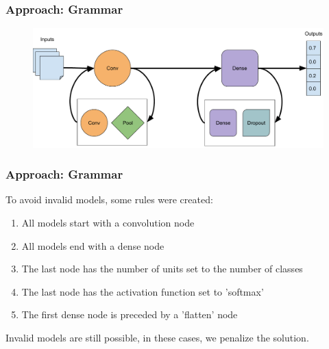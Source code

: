 \documentclass[aspectratio=169]{beamer}
\begin{document}
		\begin{frame}
			\frametitle{Approach: Grammar}
			
			\begin{figure}
				\includegraphics[width=\linewidth]{images/mapping-example.pdf}
			\end{figure}
		\end{frame}
		\begin{frame}
			\frametitle{Approach: Grammar}
			
			To avoid invalid models, some rules were created:
			
			\begin{enumerate}
				\item All models start with a convolution node
				\item All models end with a dense node
				
				\item The last node has the number of units set to the number of classes
				\item The last node has the activation function set to 'softmax'
				
				\item The first dense node is preceded by a 'flatten' node
			\end{enumerate}
		
			Invalid models are still possible, in these cases, we penalize the solution.
		
		\end{frame}
\end{document}
